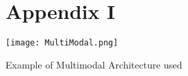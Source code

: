 \documentclass[11pt]{article}
\begin{document}





\newpage

\appendix
\newpage
\begin{figure*}
\section{Appendix I}
    \texttt{[image: MultiModal.png]}
    \caption{Example of Multimodal Architecture used}
    \label{fig:multimodal}
\end{figure*}
\label{sec:appendix}
\end{document}

